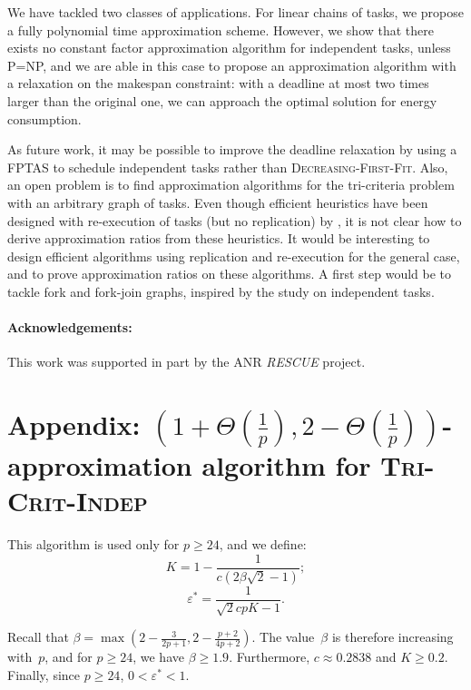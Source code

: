 \documentclass[a4paper]{article}
\theoremstyle{plain}
\theoremstyle{definition}
\theoremstyle{remark}
\newcommand{\dff}{\textsc{Dec\-reasing-First-Fit}\xspace}
\newcommand{\indep}{\textsc{Tri-Crit-In\-dep}\xspace}
\begin{document}
We have tackled two classes of applications. For linear chains of
tasks, we propose a fully polynomial time approximation scheme.
However, we show that there exists no constant factor approximation
algorithm for independent tasks, unless P=NP, and we are able in this
case to propose an approximation algorithm with a relaxation on the
makespan constraint: with a deadline at most two times larger than the
original one, we can approach the optimal solution for energy
consumption. 

As future work, it may be possible to improve the deadline relaxation
by using a FPTAS to schedule independent tasks \cite{Ausiello99}
rather than \dff \cite{Graham69}.  Also, 
an open problem is to find approximation algorithms for the
tri-criteria problem with an arbitrary graph of tasks. Even though
efficient heuristics have been designed with re-execution of 
tasks (but no replication) by \cite{rr7757}, it is not clear how to
derive approximation ratios from these heuristics. It would be
interesting to 
design efficient algorithms using replication and re-execution for
the general case, and to prove approximation ratios on these
algorithms. A first step would be to tackle fork and fork-join graphs,
inspired by the study on independent tasks. 

\paragraph*{Acknowledgements:}
This work was supported in part by the ANR {\em RESCUE} project. 



 


\clearpage
\appendix

\section*{Appendix:
  $(1+\Theta(\frac{1}{p}),2-\Theta(\frac{1}{p}))$-approximation
  algorithm for \indep}


This algorithm is used only for $p\geq 24$, and we define: 
$$K = 1- \frac{1}{c(2\beta \sqrt{2} -1)};$$
$$   \varepsilon^* = \frac{1}{\sqrt{2}cpK-1} . $$

Recall that $\beta = \max(2-\frac{3}{2p+1}, 2-
\frac{p+2}{4p+2})$. The value~$\beta$ is therefore increasing
with~$p$, and for $p\geq 24$, we have $\beta \geq 1.9$.
 Furthermore, $c\approx 0.2838$ and $K\geq 0.2$. Finally, since $p\geq
 24$, $0<\varepsilon^* <1$. 
\end{document}
